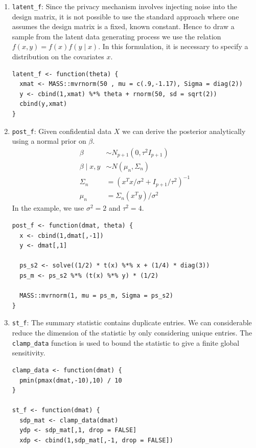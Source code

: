 \begin{enumerate}
\def\labelenumi{\arabic{enumi}.}
\item
  \texttt{latent\_f}: Since the privacy mechanism involves injecting noise into the design
  matrix, it is not possible to use the standard approach where one assumes the design
  matrix is a fixed, known constant. Hence to draw a sample from the latent data generating
  process we use the relation \(f(x,y) = f(x)f(y \mid x)\). In this formulation,
  it is necessary to specify a distribution on the covariates \(x\).

\begin{verbatim}
latent_f <- function(theta) {
  xmat <- MASS::mvrnorm(50 , mu = c(.9,-1.17), Sigma = diag(2))
  y <- cbind(1,xmat) %*% theta + rnorm(50, sd = sqrt(2))
  cbind(y,xmat)
}
\end{verbatim}
\item
  \texttt{post\_f}: Given confidential data \(X\) we can derive the posterior analytically
  using a normal prior on \(\beta\).
  \[
  \begin{aligned}
  \beta &\sim N_{p+1}(0, \tau^2 I_{p+1})\\
  \beta \mid x,y &\sim N(\mu_n, \Sigma_n)\\
  \Sigma_n &= (x^Tx/\sigma^2 + I_{p+1}/\tau^2)^{-1}\\
  \mu_n &= \Sigma_n(x^Ty)/\sigma^2
  \end{aligned}
  \]
  In the example, we use \(\sigma^2 = 2\) and \(\tau^2 = 4\).

\begin{verbatim}
post_f <- function(dmat, theta) {
  x <- cbind(1,dmat[,-1])
  y <- dmat[,1]

  ps_s2 <- solve((1/2) * t(x) %*% x + (1/4) * diag(3))
  ps_m <- ps_s2 %*% (t(x) %*% y) * (1/2)

  MASS::mvrnorm(1, mu = ps_m, Sigma = ps_s2)
}
\end{verbatim}
\item
  \texttt{st\_f}: The summary statistic contains duplicate
  entries. We can considerable reduce the dimension of the
  statistic by only considering unique entries. The \texttt{clamp\_data}
  function is used to bound the statistic to give a finite
  global sensitivity.

\begin{verbatim}
clamp_data <- function(dmat) {
  pmin(pmax(dmat,-10),10) / 10
}

st_f <- function(dmat) {
  sdp_mat <- clamp_data(dmat)
  ydp <- sdp_mat[,1, drop = FALSE]
  xdp <- cbind(1,sdp_mat[,-1, drop = FALSE])


\end{verbatim}
\end{enumerate}
